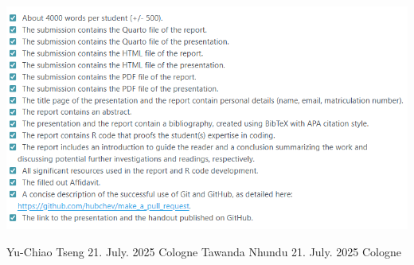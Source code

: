 \documentclass[
  man,
  floatsintext,
  longtable,
  nolmodern,
  notxfonts,
  notimes,
  colorlinks=true,linkcolor=blue,citecolor=blue,urlcolor=blue]{apa7}
\begin{document}
\label{fig:checklist}
\begin{center}
\includegraphics[width=1\linewidth,height=\textheight,keepaspectratio]{fig/checklist.png}
\end{center}

Yu-Chiao Tseng 21. July. 2025 Cologne Tawanda Nhundu 21. July. 2025
Cologne
\end{document}
